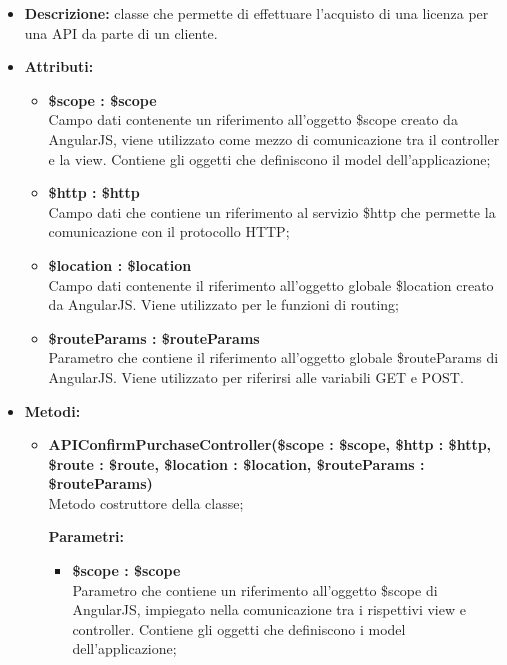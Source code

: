 \begin{itemize}
	\item \textbf{Descrizione:} classe che permette di effettuare l'acquisto di una licenza per una API da parte di un cliente.
	\item \textbf{Attributi:}
	\begin{itemize}
		
		\item \textbf{\$scope : \$scope}\\
		Campo dati contenente un riferimento all'oggetto \$scope creato da AngularJS, viene utilizzato come mezzo di comunicazione tra il controller e la view. Contiene gli oggetti che definiscono il model dell'applicazione;
		
		\item \textbf{\$http : \$http }\\
		Campo dati che contiene un riferimento al servizio \$http che permette la comunicazione con il protocollo HTTP;
		
		\item \textbf{\$location : \$location }\\
		Campo dati contenente il riferimento all'oggetto globale \$location creato da AngularJS. Viene utilizzato per le funzioni di routing;
		
		\item \textbf{\$routeParams : \$routeParams}\\
		Parametro che contiene il riferimento all'oggetto globale \$routeParams di AngularJS. Viene utilizzato per riferirsi alle variabili GET e POST.
		
		
	\end{itemize}
	\item \textbf{Metodi:}
	\begin{itemize}
		
		\item \textbf{APIConfirmPurchaseController(\$scope : \$scope, \$http : \$http, \$route : \$route, \$location : \$location, \$routeParams : \$routeParams)}\\
		Metodo costruttore della classe;
		\begin{description}
			\item[\textbf{Parametri:}]
		\end{description}
		\begin{itemize}
			\item \textbf{\$scope : \$scope}\\
			Parametro che contiene un riferimento all'oggetto \$scope di AngularJS, impiegato nella comunicazione tra i rispettivi view e controller. Contiene gli oggetti che definiscono i model dell'applicazione;
			

\end{itemize}
\end{itemize}
\end{itemize}
